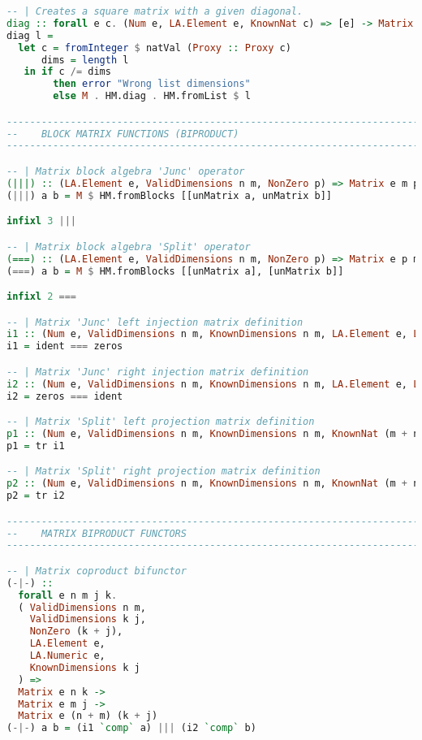 \documentclass[
  oneside,
  11pt, a4paper,
  footinclude=true,
  headinclude=true,
  cleardoublepage=empty
]{scrbook}
\theoremstyle{definition}
\theoremstyle{definition}
\begin{document}
\begin{lstlisting}[language=Haskell, caption={Matrix.Internal},captionpos=b]
-- | Creates a square matrix with a given diagonal.
diag :: forall e c. (Num e, LA.Element e, KnownNat c) => [e] -> Matrix e c c
diag l =
  let c = fromInteger $ natVal (Proxy :: Proxy c)
      dims = length l
   in if c /= dims
        then error "Wrong list dimensions"
        else M . HM.diag . HM.fromList $ l

-------------------------------------------------------------------------------
--    BLOCK MATRIX FUNCTIONS (BIPRODUCT)
-------------------------------------------------------------------------------

-- | Matrix block algebra 'Junc' operator
(|||) :: (LA.Element e, ValidDimensions n m, NonZero p) => Matrix e m p -> Matrix e n p -> Matrix e (m + n) p
(|||) a b = M $ HM.fromBlocks [[unMatrix a, unMatrix b]]

infixl 3 |||

-- | Matrix block algebra 'Split' operator
(===) :: (LA.Element e, ValidDimensions n m, NonZero p) => Matrix e p m -> Matrix e p n -> Matrix e p (m + n)
(===) a b = M $ HM.fromBlocks [[unMatrix a], [unMatrix b]]

infixl 2 ===

-- | Matrix 'Junc' left injection matrix definition
i1 :: (Num e, ValidDimensions n m, KnownDimensions n m, LA.Element e, LA.Container HM.Vector e) => Matrix e m (m + n)
i1 = ident === zeros

-- | Matrix 'Junc' right injection matrix definition
i2 :: (Num e, ValidDimensions n m, KnownDimensions n m, LA.Element e, LA.Container HM.Vector e) => Matrix e n (m + n)
i2 = zeros === ident

-- | Matrix 'Split' left projection matrix definition
p1 :: (Num e, ValidDimensions n m, KnownDimensions n m, KnownNat (m + n), LA.Element e, LA.Container HM.Vector e) => Matrix e (m + n) m
p1 = tr i1

-- | Matrix 'Split' right projection matrix definition
p2 :: (Num e, ValidDimensions n m, KnownDimensions n m, KnownNat (m + n), LA.Element e, LA.Container HM.Vector e) => Matrix e (m + n) n
p2 = tr i2

-------------------------------------------------------------------------------
--    MATRIX BIPRODUCT FUNCTORS
-------------------------------------------------------------------------------

-- | Matrix coproduct bifunctor
(-|-) ::
  forall e n m j k.
  ( ValidDimensions n m,
    ValidDimensions k j,
    NonZero (k + j),
    LA.Element e,
    LA.Numeric e,
    KnownDimensions k j
  ) =>
  Matrix e n k ->
  Matrix e m j ->
  Matrix e (n + m) (k + j)
(-|-) a b = (i1 `comp` a) ||| (i2 `comp` b)


\end{lstlisting}
\end{document}
